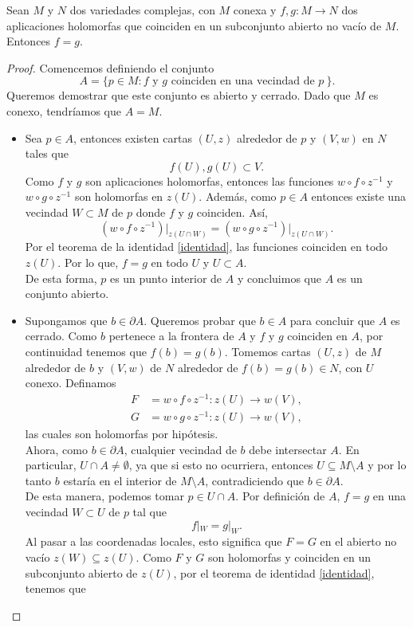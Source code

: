     \begin{theorem}\label{teoidentidad}
        Sean $M$ y $N$ dos variedades complejas, con $M$ conexa y $f,g:M\to N$ dos aplicaciones holomorfas que coinciden en un subconjunto abierto no vacío de $M$. Entonces $f=g$. 
    \end{theorem}
	\begin{proof}
		Comencemos definiendo el conjunto
		\begin{equation*}
			A=\{p\in M:f\text{ y }g\text{ coinciden en una vecindad de }p\ \}.
		\end{equation*}
		Queremos demostrar que este conjunto es abierto y cerrado. Dado que $M$ es conexo, tendríamos que $A=M$.
		\begin{itemize}
			\item Sea $p\in A$, entonces existen cartas $(U,z)$ alrededor de $p$ y $(V,w)$ en $N$ tales que
			\begin{equation*}
				f(U),g(U)\subset V.
			\end{equation*}
			Como $f$ y $g$ son aplicaciones holomorfas, entonces las funciones $w\circ f\circ z^{-1}$ y $w\circ g\circ z^{-1}$ son holomorfas en $z(U)$. Además, como $p\in A$ entonces existe una vecindad $W\subset M$ de $p$ donde $f$ y $g$ coinciden. Así,
			\begin{equation*}
				(w\circ f\circ z^{-1})\left.\right|_{z(U\cap W)}=(w\circ g\circ z^{-1})\left.\right|_{z(U\cap W)}.
			\end{equation*} 
			Por el teorema de la identidad \ref{identidad}, las funciones coinciden en todo $z(U)$.
			Por lo que, $f=g$ en todo $U$ y $U\subset A$.\\
			De esta forma, $p$ es un punto interior de $A$ y concluimos que $A$ es un conjunto abierto.
			
			\item Supongamos que $b\in \partial A$. Queremos probar que $b\in A$ para concluir que $A$ es cerrado.
			Como $b$ pertenece a la frontera de $A$ y $f$ y $g$ coinciden en $A$, por continuidad tenemos que $f(b)=g(b)$. Tomemos cartas $(U,z)$ de $M$ alrededor de $b$ y $(V,w)$ de $N$ alrededor de $f(b)=g(b)\in N$, con $U$ conexo. Definamos
			\begin{align*}
				F&=w\circ f\circ z^{-1}:z(U)\to w(V),\\
				G&=w\circ g\circ z^{-1}:z(U)\to w(V),
			\end{align*}
			las cuales son holomorfas por hipótesis.\\
			Ahora, como $b\in\partial A$, cualquier vecindad de $b$ debe intersectar $A$. En particular, $U\cap A\neq\emptyset$, ya que si esto no ocurriera, entonces $U\subseteq M\setminus A$ y por lo tanto $b$ estaría en el interior de $M\setminus A$, contradiciendo que $b\in\partial A$.\\
			De esta manera, podemos tomar $p\in U\cap A$. Por definición de $A$, $f=g$ en una vecindad $W\subset U$ de $p$ tal que
			$$
			f|_W = g|_W.
			$$
			Al pasar a las coordenadas locales,
			esto significa que $F=G$ en el abierto no vacío $z(W)\subseteq z(U)$. Como $F$ y $G$ son holomorfas y coinciden en un subconjunto abierto de $z(U)$, por el teorema de identidad \ref{identidad}, tenemos que
			

\end{itemize}
\end{proof}

